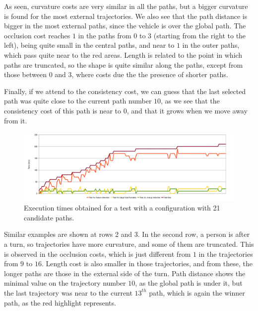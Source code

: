 As seen, curvature costs are very similar in all the paths, but a bigger curvature is found for the most external trajectories. We also see that the path distance is bigger in the most external paths, since the vehicle is over the global path. The occlusion cost reaches $1$ in the paths from $0$ to $3$ (starting from the right to the left), being quite small in the central paths, and near to $1$ in the outer paths, which pass quite near to the red areas. Length is related to the point in which paths are truncated, so the shape is quite similar along the paths, except from those between $0$ and $3$, where costs due the the presence of shorter paths.

Finally, if we attend to the consistency cost, we can guess that the last selected path was quite close to the current path number $10$, as we see that the consistency cost of this path is near to $0$, and that it grows when we move away from it.

\begin{figure}[h!]
  \centering
  \includegraphics[width=\textwidth,height=0.5\textwidth,trim=50 50 90 60, clip]{times}
  \caption{Execution times obtained for a test with a configuration with 21 candidate paths.}\label{fig:cp07_times}
\end{figure}

Similar examples are shown at rows 2 and 3. In the second row, a person is after a turn, so trajectories have more curvature, and some of them are truncated. This is observed in the occlusion costs, which is just different from $1$ in the trajectories from $9$ to $16$. Length cost is also smaller in those trajectories, and from these, the longer paths are those in the external side of the turn. Path distance shows the minimal value on the trajectory number $10$, as the global path is under it, but the last trajectory was near to the current $13^{th}$ path, which is again the winner path, as the red highlight represents.

